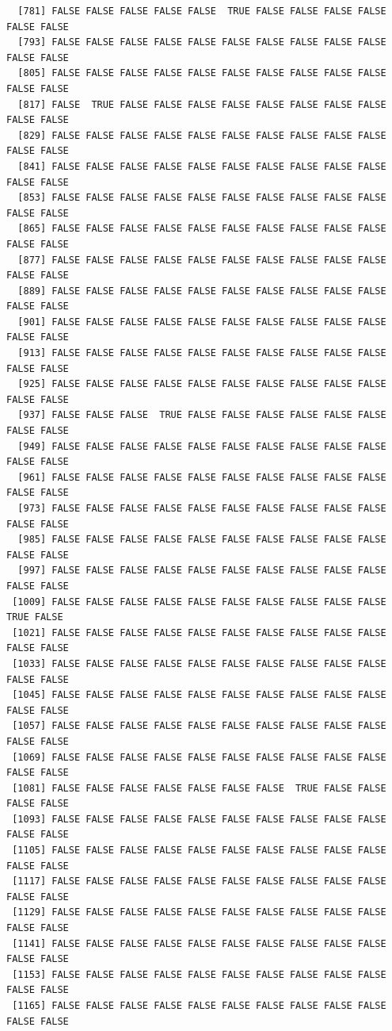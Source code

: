 \documentclass[
  a4paper,
  DIV=11,
  numbers=noendperiod]{scrartcl}
\begin{document}
\begin{verbatim}
  [781] FALSE FALSE FALSE FALSE FALSE  TRUE FALSE FALSE FALSE FALSE FALSE FALSE
  [793] FALSE FALSE FALSE FALSE FALSE FALSE FALSE FALSE FALSE FALSE FALSE FALSE
  [805] FALSE FALSE FALSE FALSE FALSE FALSE FALSE FALSE FALSE FALSE FALSE FALSE
  [817] FALSE  TRUE FALSE FALSE FALSE FALSE FALSE FALSE FALSE FALSE FALSE FALSE
  [829] FALSE FALSE FALSE FALSE FALSE FALSE FALSE FALSE FALSE FALSE FALSE FALSE
  [841] FALSE FALSE FALSE FALSE FALSE FALSE FALSE FALSE FALSE FALSE FALSE FALSE
  [853] FALSE FALSE FALSE FALSE FALSE FALSE FALSE FALSE FALSE FALSE FALSE FALSE
  [865] FALSE FALSE FALSE FALSE FALSE FALSE FALSE FALSE FALSE FALSE FALSE FALSE
  [877] FALSE FALSE FALSE FALSE FALSE FALSE FALSE FALSE FALSE FALSE FALSE FALSE
  [889] FALSE FALSE FALSE FALSE FALSE FALSE FALSE FALSE FALSE FALSE FALSE FALSE
  [901] FALSE FALSE FALSE FALSE FALSE FALSE FALSE FALSE FALSE FALSE FALSE FALSE
  [913] FALSE FALSE FALSE FALSE FALSE FALSE FALSE FALSE FALSE FALSE FALSE FALSE
  [925] FALSE FALSE FALSE FALSE FALSE FALSE FALSE FALSE FALSE FALSE FALSE FALSE
  [937] FALSE FALSE FALSE  TRUE FALSE FALSE FALSE FALSE FALSE FALSE FALSE FALSE
  [949] FALSE FALSE FALSE FALSE FALSE FALSE FALSE FALSE FALSE FALSE FALSE FALSE
  [961] FALSE FALSE FALSE FALSE FALSE FALSE FALSE FALSE FALSE FALSE FALSE FALSE
  [973] FALSE FALSE FALSE FALSE FALSE FALSE FALSE FALSE FALSE FALSE FALSE FALSE
  [985] FALSE FALSE FALSE FALSE FALSE FALSE FALSE FALSE FALSE FALSE FALSE FALSE
  [997] FALSE FALSE FALSE FALSE FALSE FALSE FALSE FALSE FALSE FALSE FALSE FALSE
 [1009] FALSE FALSE FALSE FALSE FALSE FALSE FALSE FALSE FALSE FALSE  TRUE FALSE
 [1021] FALSE FALSE FALSE FALSE FALSE FALSE FALSE FALSE FALSE FALSE FALSE FALSE
 [1033] FALSE FALSE FALSE FALSE FALSE FALSE FALSE FALSE FALSE FALSE FALSE FALSE
 [1045] FALSE FALSE FALSE FALSE FALSE FALSE FALSE FALSE FALSE FALSE FALSE FALSE
 [1057] FALSE FALSE FALSE FALSE FALSE FALSE FALSE FALSE FALSE FALSE FALSE FALSE
 [1069] FALSE FALSE FALSE FALSE FALSE FALSE FALSE FALSE FALSE FALSE FALSE FALSE
 [1081] FALSE FALSE FALSE FALSE FALSE FALSE FALSE  TRUE FALSE FALSE FALSE FALSE
 [1093] FALSE FALSE FALSE FALSE FALSE FALSE FALSE FALSE FALSE FALSE FALSE FALSE
 [1105] FALSE FALSE FALSE FALSE FALSE FALSE FALSE FALSE FALSE FALSE FALSE FALSE
 [1117] FALSE FALSE FALSE FALSE FALSE FALSE FALSE FALSE FALSE FALSE FALSE FALSE
 [1129] FALSE FALSE FALSE FALSE FALSE FALSE FALSE FALSE FALSE FALSE FALSE FALSE
 [1141] FALSE FALSE FALSE FALSE FALSE FALSE FALSE FALSE FALSE FALSE FALSE FALSE
 [1153] FALSE FALSE FALSE FALSE FALSE FALSE FALSE FALSE FALSE FALSE FALSE FALSE
 [1165] FALSE FALSE FALSE FALSE FALSE FALSE FALSE FALSE FALSE FALSE FALSE FALSE

\end{verbatim}
\end{document}
